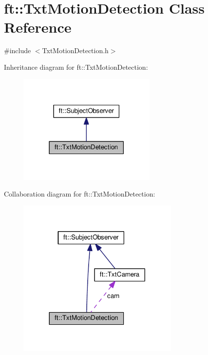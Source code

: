 \hypertarget{classft_1_1_txt_motion_detection}{}\section{ft\+:\+:Txt\+Motion\+Detection Class Reference}
\label{classft_1_1_txt_motion_detection}


{\ttfamily \#include $<$Txt\+Motion\+Detection.\+h$>$}



Inheritance diagram for ft\+:\+:Txt\+Motion\+Detection\+:
\nopagebreak
\begin{figure}[H]
\begin{center}
\leavevmode
\includegraphics[width=194pt]{classft_1_1_txt_motion_detection__inherit__graph}
\end{center}
\end{figure}


Collaboration diagram for ft\+:\+:Txt\+Motion\+Detection\+:
\nopagebreak
\begin{figure}[H]
\begin{center}
\leavevmode
\includegraphics[width=227pt]{classft_1_1_txt_motion_detection__coll__graph}
\end{center}
\end{figure}
